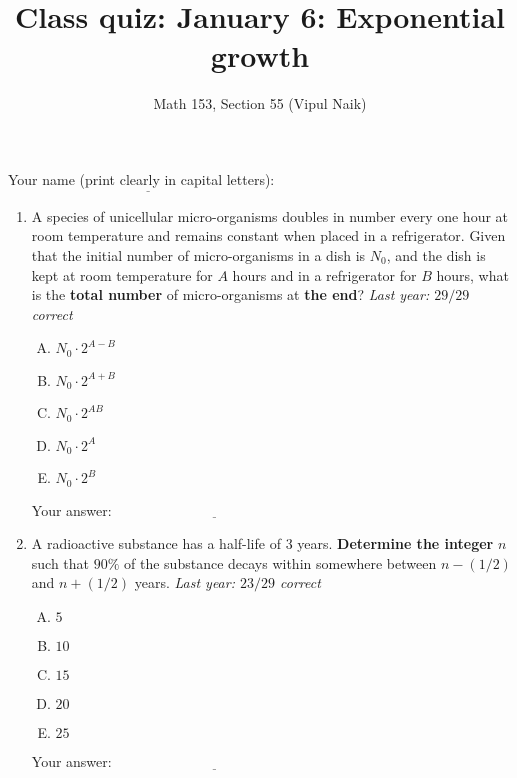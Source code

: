 \documentclass[10pt]{amsart}
\title{Class quiz: January 6: Exponential growth}
\author{Math 153, Section 55 (Vipul Naik)}
\begin{document}
\maketitle

Your name (print clearly in capital letters): $\underline{\qquad\qquad\qquad\qquad\qquad\qquad\qquad\qquad\qquad\qquad}$

\begin{enumerate}
\item A species of unicellular micro-organisms doubles in number every
  one hour at room temperature and remains constant when placed in a
  refrigerator. Given that the initial number of micro-organisms in a
  dish is $N_0$, and the dish is kept at room temperature for $A$ hours
  and in a refrigerator for $B$ hours, what is the {\bf total number} of
  micro-organisms at {\bf the end}? {\em Last year: $29/29$ correct}

  \begin{enumerate}[(A)]
  \item $N_0 \cdot 2^{A - B}$
  \item $N_0 \cdot 2^{A + B}$
  \item $N_0 \cdot 2^{AB}$
  \item $N_0 \cdot 2^A$
  \item $N_0 \cdot 2^B$
  \end{enumerate}

  \vspace{0.1in}
  Your answer: $\underline{\qquad\qquad\qquad\qquad\qquad\qquad\qquad}$
  \vspace{0.1in}

\item A radioactive substance has a half-life of $3$ years. {\bf
  Determine the integer} $n$ such that $90\%$ of the substance decays
  within somewhere between $n - (1/2)$ and $n + (1/2)$ years. {\em
  Last year: $23/29$ correct}

  \begin{enumerate}[(A)]
  \item $5$
  \item $10$
  \item $15$
  \item $20$
  \item $25$
  \end{enumerate}

  \vspace{0.1in}
  Your answer: $\underline{\qquad\qquad\qquad\qquad\qquad\qquad\qquad}$
  \vspace{0.1in}


\end{enumerate}
\end{document}
